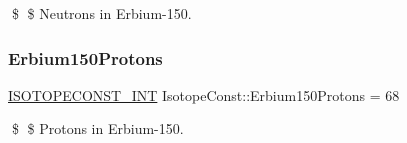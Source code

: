 \$ \$ Neutrons in Erbium-\/150. \mbox{\label{group___isotope_const-_erbium-_er150_gacb898bacf3cc6a4d56494ecd7f1f2c92}} 
\subsubsection{\texorpdfstring{Erbium150\+Protons}{Erbium150Protons}}
{\footnotesize\ttfamily \mbox{\hyperlink{group___isotope_const-_macros_ga5f18360b3e99483a35c32d789e62621c}{I\+S\+O\+T\+O\+P\+E\+C\+O\+N\+S\+T\+\_\+\+I\+NT}} Isotope\+Const\+::\+Erbium150\+Protons = 68}

\$ \$ Protons in Erbium-\/150. 